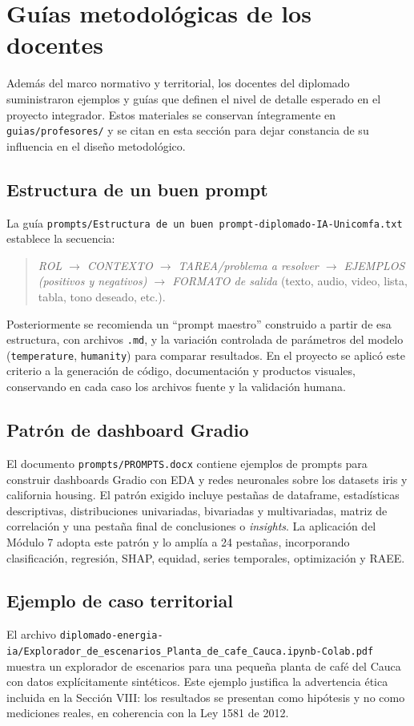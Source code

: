 \section{Guías metodológicas de los docentes}
Además del marco normativo y territorial, los docentes del diplomado suministraron ejemplos y guías que definen el nivel de detalle esperado en el proyecto integrador. Estos materiales se conservan íntegramente en \texttt{guias/profesores/} y se citan en esta sección para dejar constancia de su influencia en el diseño metodológico.

\subsection{Estructura de un buen prompt}
La guía \texttt{prompts/Estructura de un buen prompt-diplomado-IA-Unicomfa.txt} establece la secuencia:
\begin{quote}
\emph{ROL $\rightarrow$ CONTEXTO $\rightarrow$ TAREA/problema a resolver $\rightarrow$ EJEMPLOS (positivos y negativos) $\rightarrow$ FORMATO de salida} (texto, audio, video, lista, tabla, tono deseado, etc.).
\end{quote}
Posteriormente se recomienda un ``prompt maestro'' construido a partir de esa estructura, con archivos \texttt{.md}, y la variación controlada de parámetros del modelo (\texttt{temperature}, \texttt{humanity}) para comparar resultados. En el proyecto se aplicó este criterio a la generación de código, documentación y productos visuales, conservando en cada caso los archivos fuente y la validación humana.

\subsection{Patrón de dashboard Gradio}
El documento \texttt{prompts/PROMPTS.docx} contiene ejemplos de prompts para construir dashboards Gradio con EDA y redes neuronales sobre los datasets iris y california housing. El patrón exigido incluye pestañas de dataframe, estadísticas descriptivas, distribuciones univariadas, bivariadas y multivariadas, matriz de correlación y una pestaña final de conclusiones o \emph{insights}. La aplicación del Módulo 7 adopta este patrón y lo amplía a 24 pestañas, incorporando clasificación, regresión, SHAP, equidad, series temporales, optimización y RAEE.

\subsection{Ejemplo de caso territorial}
El archivo \texttt{diplomado-energia-ia/Explorador\_de\_escenarios\_Planta\_de\_cafe\_Cauca.ipynb-Colab.pdf} muestra un explorador de escenarios para una pequeña planta de café del Cauca con datos explícitamente sintéticos. Este ejemplo justifica la advertencia ética incluida en la Sección VIII: los resultados se presentan como hipótesis y no como mediciones reales, en coherencia con la Ley 1581 de 2012.

